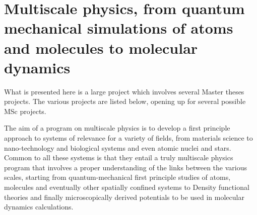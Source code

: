 \documentclass[10pt]{article}
\begin{document}
\section*{Multiscale physics, from quantum mechanical simulations of atoms and molecules to molecular dynamics}

What is presented here is a large project which involves several Master theses  projects. 
The various projects are listed below, opening up for several possible MSc projects.

The aim of a program on multiscale physics is to develop a 
first principle approach to systems of relevance for a variety of fields, from materials science to nano-technology and biological systems and even
atomic nuclei  and stars. 
Common to all these systems is that they entail a truly multiscale physics program that involves a proper understanding of the links
between the various scales, starting 
from quantum-mechanical first principle studies of atoms, molecules and eventually other spatially confined 
systems to Density functional theories and finally microscopically derived potentials to be used in molecular dynamics calculations. 
\end{document}
